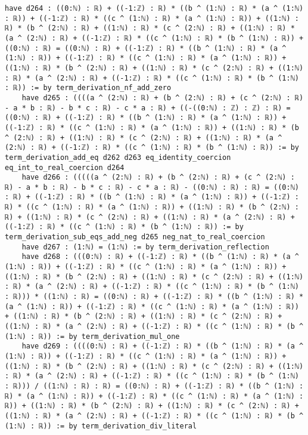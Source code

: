 \documentclass{article}
\begin{document}
\begin{tcolorbox}[colback=white!10, width=\linewidth]
\begin{lstlisting}[language=Lean4]
    have d264 : ((0:ℕ) : ℝ) + ((-1:ℤ) : ℝ) * ((b ^ (1:ℕ) : ℝ) * (a ^ (1:ℕ) : ℝ)) + ((-1:ℤ) : ℝ) * ((c ^ (1:ℕ) : ℝ) * (a ^ (1:ℕ) : ℝ)) + ((1:ℕ) : ℝ) * (b ^ (2:ℕ) : ℝ) + ((1:ℕ) : ℝ) * (c ^ (2:ℕ) : ℝ) + ((1:ℕ) : ℝ) * (a ^ (2:ℕ) : ℝ) + ((-1:ℤ) : ℝ) * ((c ^ (1:ℕ) : ℝ) * (b ^ (1:ℕ) : ℝ)) + ((0:ℕ) : ℝ) = ((0:ℕ) : ℝ) + ((-1:ℤ) : ℝ) * ((b ^ (1:ℕ) : ℝ) * (a ^ (1:ℕ) : ℝ)) + ((-1:ℤ) : ℝ) * ((c ^ (1:ℕ) : ℝ) * (a ^ (1:ℕ) : ℝ)) + ((1:ℕ) : ℝ) * (b ^ (2:ℕ) : ℝ) + ((1:ℕ) : ℝ) * (c ^ (2:ℕ) : ℝ) + ((1:ℕ) : ℝ) * (a ^ (2:ℕ) : ℝ) + ((-1:ℤ) : ℝ) * ((c ^ (1:ℕ) : ℝ) * (b ^ (1:ℕ) : ℝ)) := by term_derivation_nf_add_zero
    have d265 : ((((a ^ (2:ℕ) : ℝ) + (b ^ (2:ℕ) : ℝ) + (c ^ (2:ℕ) : ℝ) - a * b : ℝ) - b * c : ℝ) - c * a : ℝ) + ((-((0:ℕ) : ℤ) : ℤ) : ℝ) = ((0:ℕ) : ℝ) + ((-1:ℤ) : ℝ) * ((b ^ (1:ℕ) : ℝ) * (a ^ (1:ℕ) : ℝ)) + ((-1:ℤ) : ℝ) * ((c ^ (1:ℕ) : ℝ) * (a ^ (1:ℕ) : ℝ)) + ((1:ℕ) : ℝ) * (b ^ (2:ℕ) : ℝ) + ((1:ℕ) : ℝ) * (c ^ (2:ℕ) : ℝ) + ((1:ℕ) : ℝ) * (a ^ (2:ℕ) : ℝ) + ((-1:ℤ) : ℝ) * ((c ^ (1:ℕ) : ℝ) * (b ^ (1:ℕ) : ℝ)) := by term_derivation_add_eq d262 d263 eq_identity_coercion eq_int_to_real_coercion d264
    have d266 : (((((a ^ (2:ℕ) : ℝ) + (b ^ (2:ℕ) : ℝ) + (c ^ (2:ℕ) : ℝ) - a * b : ℝ) - b * c : ℝ) - c * a : ℝ) - ((0:ℕ) : ℝ) : ℝ) = ((0:ℕ) : ℝ) + ((-1:ℤ) : ℝ) * ((b ^ (1:ℕ) : ℝ) * (a ^ (1:ℕ) : ℝ)) + ((-1:ℤ) : ℝ) * ((c ^ (1:ℕ) : ℝ) * (a ^ (1:ℕ) : ℝ)) + ((1:ℕ) : ℝ) * (b ^ (2:ℕ) : ℝ) + ((1:ℕ) : ℝ) * (c ^ (2:ℕ) : ℝ) + ((1:ℕ) : ℝ) * (a ^ (2:ℕ) : ℝ) + ((-1:ℤ) : ℝ) * ((c ^ (1:ℕ) : ℝ) * (b ^ (1:ℕ) : ℝ)) := by term_derivation_sub_eqs_add_neg d265 neg_nat_to_real_coercion
    have d267 : (1:ℕ) = (1:ℕ) := by term_derivation_reflection
    have d268 : (((0:ℕ) : ℝ) + ((-1:ℤ) : ℝ) * ((b ^ (1:ℕ) : ℝ) * (a ^ (1:ℕ) : ℝ)) + ((-1:ℤ) : ℝ) * ((c ^ (1:ℕ) : ℝ) * (a ^ (1:ℕ) : ℝ)) + ((1:ℕ) : ℝ) * (b ^ (2:ℕ) : ℝ) + ((1:ℕ) : ℝ) * (c ^ (2:ℕ) : ℝ) + ((1:ℕ) : ℝ) * (a ^ (2:ℕ) : ℝ) + ((-1:ℤ) : ℝ) * ((c ^ (1:ℕ) : ℝ) * (b ^ (1:ℕ) : ℝ))) * ((1:ℕ) : ℝ) = ((0:ℕ) : ℝ) + ((-1:ℤ) : ℝ) * ((b ^ (1:ℕ) : ℝ) * (a ^ (1:ℕ) : ℝ)) + ((-1:ℤ) : ℝ) * ((c ^ (1:ℕ) : ℝ) * (a ^ (1:ℕ) : ℝ)) + ((1:ℕ) : ℝ) * (b ^ (2:ℕ) : ℝ) + ((1:ℕ) : ℝ) * (c ^ (2:ℕ) : ℝ) + ((1:ℕ) : ℝ) * (a ^ (2:ℕ) : ℝ) + ((-1:ℤ) : ℝ) * ((c ^ (1:ℕ) : ℝ) * (b ^ (1:ℕ) : ℝ)) := by term_derivation_mul_one
    have d269 : ((((0:ℕ) : ℝ) + ((-1:ℤ) : ℝ) * ((b ^ (1:ℕ) : ℝ) * (a ^ (1:ℕ) : ℝ)) + ((-1:ℤ) : ℝ) * ((c ^ (1:ℕ) : ℝ) * (a ^ (1:ℕ) : ℝ)) + ((1:ℕ) : ℝ) * (b ^ (2:ℕ) : ℝ) + ((1:ℕ) : ℝ) * (c ^ (2:ℕ) : ℝ) + ((1:ℕ) : ℝ) * (a ^ (2:ℕ) : ℝ) + ((-1:ℤ) : ℝ) * ((c ^ (1:ℕ) : ℝ) * (b ^ (1:ℕ) : ℝ))) / ((1:ℕ) : ℝ) : ℝ) = ((0:ℕ) : ℝ) + ((-1:ℤ) : ℝ) * ((b ^ (1:ℕ) : ℝ) * (a ^ (1:ℕ) : ℝ)) + ((-1:ℤ) : ℝ) * ((c ^ (1:ℕ) : ℝ) * (a ^ (1:ℕ) : ℝ)) + ((1:ℕ) : ℝ) * (b ^ (2:ℕ) : ℝ) + ((1:ℕ) : ℝ) * (c ^ (2:ℕ) : ℝ) + ((1:ℕ) : ℝ) * (a ^ (2:ℕ) : ℝ) + ((-1:ℤ) : ℝ) * ((c ^ (1:ℕ) : ℝ) * (b ^ (1:ℕ) : ℝ)) := by term_derivation_div_literal

\end{lstlisting}
\end{tcolorbox}
\end{document}
